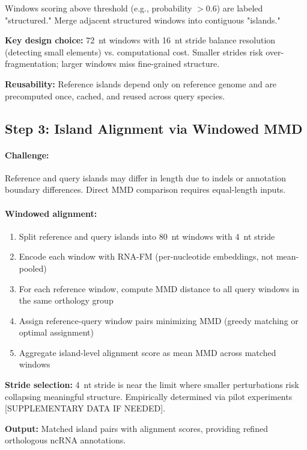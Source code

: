 \documentclass[11pt]{article}
\begin{document}
Windows scoring above threshold (e.g., probability $>$0.6) are labeled "structured." Merge adjacent structured windows into contiguous "islands."

\textbf{Key design choice:} 72~nt windows with 16~nt stride balance resolution (detecting small elements) vs. computational cost. Smaller strides risk over-fragmentation; larger windows miss fine-grained structure.

\textbf{Reusability:} Reference islands depend only on reference genome and are precomputed once, cached, and reused across query species.

\subsection{Step 3: Island Alignment via Windowed MMD}

\paragraph{Challenge:} Reference and query islands may differ in length due to indels or annotation boundary differences. Direct MMD comparison requires equal-length inputs.

\paragraph{Windowed alignment:}
\begin{enumerate}
\item Split reference and query islands into 80~nt windows with 4~nt stride
\item Encode each window with RNA-FM (per-nucleotide embeddings, not mean-pooled)
\item For each reference window, compute MMD distance to all query windows in the same orthology group
\item Assign reference-query window pairs minimizing MMD (greedy matching or optimal assignment)
\item Aggregate island-level alignment score as mean MMD across matched windows
\end{enumerate}

\textbf{Stride selection:} 4~nt stride is near the limit where smaller perturbations risk collapsing meaningful structure. Empirically determined via pilot experiments [SUPPLEMENTARY DATA IF NEEDED].

\textbf{Output:} Matched island pairs with alignment scores, providing refined orthologous ncRNA annotations.
\end{document}
